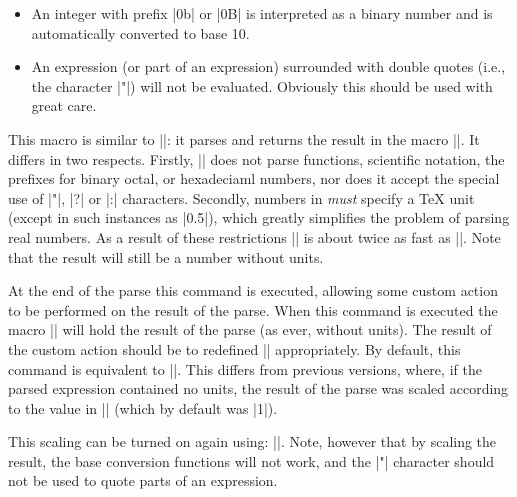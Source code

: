 \begin{command}{\pgfmathparse{}}
\begin{itemize}
	\item
  An integer with prefix |0b| or |0B| is interpreted as a binary
  number and is automatically converted to base 10. 
  
  \item
  An expression (or part of an expression) surrounded with double
  quotes (i.e., the character |"|) will not be evaluated. 
  Obviously this should be used with great care. 

\end{itemize}
  
\end{command}



\begin{command}{\pgfmathqparse{}}
  This macro is similar to |\pgfmathparse|: it parses 
   and returns the result in the macro 
  |\pgfmathresult|. It differs in two respects. Firstly, 
  |\pgfmathqparse| does not parse functions, scientific
  notation, the prefixes for binary octal, or hexadeciaml numbers,
  nor does it accept the special use of |"|, |?| or |:| characters.
  Secondly, numbers in  \emph{must}
  specify a \TeX{} unit (except in such instances as |0.5\pgf@x|), 
  which greatly simplifies the problem of parsing real numbers.
  As a result of these restrictions |\pgfmathqparse| 
  is about twice as fast as |\pgfmathparse|. Note that the result 
  will still be a number without units.	
\end{command}

\begin{command}{\pgfmathpostparse}

  At the end of the parse this command is executed, allowing some 
  custom action to be performed on the result of the parse. When this
  command is executed the macro |\pgfmathresult| will hold the result
  of the parse (as ever, without units). The result of the custom
  action should be to redefined |\pgfmathresult| appropriately.   
  By default, this command is equivalent to |\relax|. This differs
  from previous versions, where, if the parsed expression contained
  no units, the result of the parse was scaled according to the value
  in |\pgfmathresultunitscale| (which by default was |1|).
  
  This scaling can be  turned on again using:
  |\let\pgfmathpostparse=\pgfmathscaleresult|.
  Note, however that by scaling the result, the base conversion
  functions will not work, and the |"| character should not be
  used to quote parts of an expression. 
    
\end{command}

